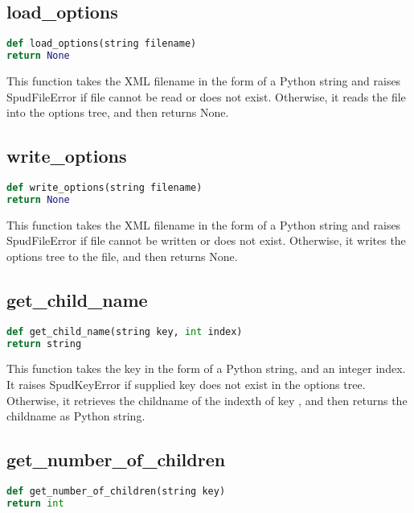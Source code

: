 \documentclass[a4paper, 11pt]{book}
\begin{document}
\subsection{load\_options}

\begin{lstlisting}[language=Python]
def load_options(string filename)
return None
\end{lstlisting}

This function takes the XML filename in the form of a Python string and raises SpudFileError if file cannot be read or does not exist.
Otherwise, it reads the file into the options tree, and then returns None.

\subsection{write\_options}

\begin{lstlisting}[language=Python]
def write_options(string filename)
return None
\end{lstlisting}

This function takes the XML filename in the form of a Python string and raises SpudFileError if file cannot be written or does not exist.
Otherwise, it writes the options tree to the file, and then returns None.

\subsection{get\_child\_name}

\begin{lstlisting}[language=Python]
def get_child_name(string key, int index)
return string
\end{lstlisting}

This function takes the key in the form of a Python string, and an integer index.
It raises SpudKeyError if supplied key does not exist in the options tree.
Otherwise, it retrieves the childname of the indexth of key , and then returns the childname as Python string.

\subsection{get\_number\_of\_children}

\begin{lstlisting}[language=Python]
def get_number_of_children(string key)
return int
\end{lstlisting}
\end{document}
